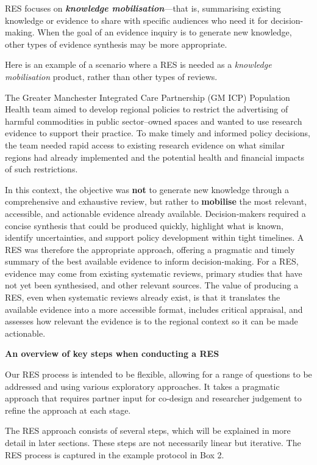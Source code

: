 \documentclass[
  letterpaper,
  DIV=11,
  numbers=noendperiod]{scrreprt}
\begin{document}
RES focuses on \textbf{\emph{knowledge mobilisation}}---that is,
summarising existing knowledge or evidence to share with specific
audiences who need it for decision-making. When the goal of an evidence
inquiry is to generate new knowledge, other types of evidence synthesis
may be more appropriate.

Here is an example of a scenario where a RES is needed as a
\emph{knowledge mobilisation} product, rather than other types of
reviews.

The Greater Manchester Integrated Care Partnership (GM ICP) Population
Health team aimed to develop regional policies to restrict the
advertising of harmful commodities in public sector--owned spaces and
wanted to use research evidence to support their practice. To make
timely and informed policy decisions, the team needed rapid access to
existing research evidence on what similar regions had already
implemented and the potential health and financial impacts of such
restrictions.

In this context, the objective was \textbf{not} to generate new
knowledge through a comprehensive and exhaustive review, but rather to
\textbf{mobilise} the most relevant, accessible, and actionable evidence
already available. Decision‑makers required a concise synthesis that
could be produced quickly, highlight what is known, identify
uncertainties, and support policy development within tight timelines. A
RES was therefore the appropriate approach, offering a pragmatic and
timely summary of the best available evidence to inform decision‑making.
For a RES, evidence may come from existing systematic reviews, primary
studies that have not yet been synthesised, and other relevant sources.
The value of producing a RES, even when systematic reviews already
exist, is that it translates the available evidence into a more
accessible format, includes critical appraisal, and assesses how
relevant the evidence is to the regional context so it can be made
actionable.

\textbf{An overview of key steps when conducting a RES}

Our RES process is intended to be flexible, allowing for a range of
questions to be addressed and using various exploratory approaches. It
takes a pragmatic approach that requires partner input for co-design and
researcher judgement to refine the approach at each stage.

The RES approach consists of several steps, which will be explained in
more detail in later sections. These steps are not necessarily linear
but iterative. The RES process is captured in the example protocol in
Box 2.
\end{document}
